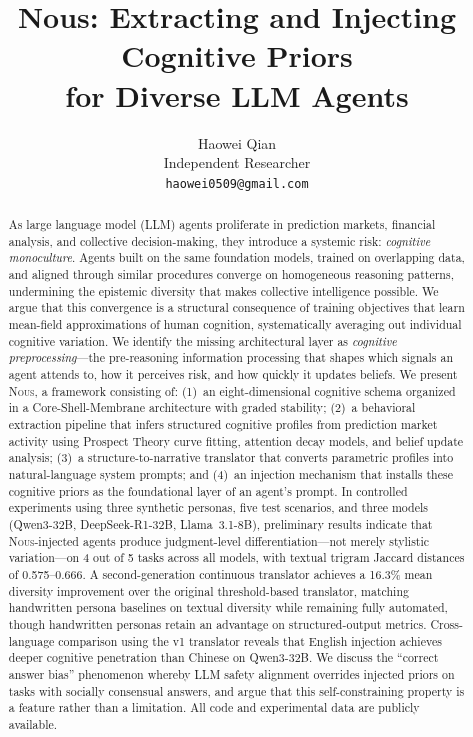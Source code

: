 \documentclass[11pt]{article}
\title{\textbf{Nous: Extracting and Injecting Cognitive Priors\\for Diverse LLM Agents}}
\author{
  Haowei Qian \\
  Independent Researcher \\
  \texttt{haowei0509@gmail.com}
}
\date{}
\newcommand{\nous}{\textsc{Nous}}
\begin{document}
\maketitle

\begin{abstract}
As large language model (LLM) agents proliferate in prediction markets, financial analysis, and collective decision-making, they introduce a systemic risk: \emph{cognitive monoculture}. Agents built on the same foundation models, trained on overlapping data, and aligned through similar procedures converge on homogeneous reasoning patterns, undermining the epistemic diversity that makes collective intelligence possible. We argue that this convergence is a structural consequence of training objectives that learn mean-field approximations of human cognition, systematically averaging out individual cognitive variation. We identify the missing architectural layer as \emph{cognitive preprocessing}---the pre-reasoning information processing that shapes which signals an agent attends to, how it perceives risk, and how quickly it updates beliefs. We present \nous{}, a framework consisting of: (1)~an eight-dimensional cognitive schema organized in a Core-Shell-Membrane architecture with graded stability; (2)~a behavioral extraction pipeline that infers structured cognitive profiles from prediction market activity using Prospect Theory curve fitting, attention decay models, and belief update analysis; (3)~a structure-to-narrative translator that converts parametric profiles into natural-language system prompts; and (4)~an injection mechanism that installs these cognitive priors as the foundational layer of an agent's prompt. In controlled experiments using three synthetic personas, five test scenarios, and three models (Qwen3-32B, DeepSeek-R1-32B, Llama~3.1-8B), preliminary results indicate that \nous{}-injected agents produce judgment-level differentiation---not merely stylistic variation---on 4 out of 5 tasks across all models, with textual trigram Jaccard distances of 0.575--0.666. A second-generation continuous translator achieves a 16.3\% mean diversity improvement over the original threshold-based translator, matching handwritten persona baselines on textual diversity while remaining fully automated, though handwritten personas retain an advantage on structured-output metrics. Cross-language comparison using the v1 translator reveals that English injection achieves deeper cognitive penetration than Chinese on Qwen3-32B. We discuss the ``correct answer bias'' phenomenon whereby LLM safety alignment overrides injected priors on tasks with socially consensual answers, and argue that this self-constraining property is a feature rather than a limitation. All code and experimental data are publicly available.
\end{abstract}
\end{document}
